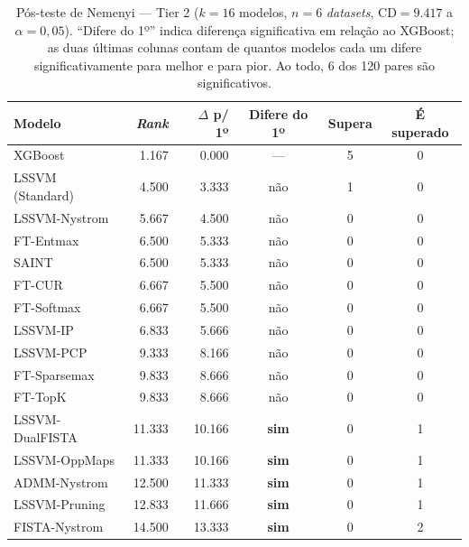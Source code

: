 \begin{table}[ht]
  \centering
  \caption{Pós-teste de Nemenyi --- Tier 2 ($k=16$ modelos, $n=6$ \textit{datasets}, $\mathrm{CD}=9.417$ a $\alpha=0{,}05$). ``Difere do 1º'' indica diferença significativa em relação ao XGBoost; as duas últimas colunas contam de quantos modelos cada um difere significativamente para melhor e para pior. Ao todo, 6 dos 120 pares são significativos.}
  \label{tab:tier2_nemenyi}
  \begin{tabular}{lrrccc}
    \toprule
    Modelo & \textit{Rank} & $\Delta$ p/ 1º & Difere do 1º & Supera & É superado \\
    \midrule
    XGBoost & 1.167 & 0.000 & --- & 5 & 0 \\
    LSSVM (Standard) & 4.500 & 3.333 & não & 1 & 0 \\
    LSSVM-Nystrom & 5.667 & 4.500 & não & 0 & 0 \\
    FT-Entmax & 6.500 & 5.333 & não & 0 & 0 \\
    SAINT & 6.500 & 5.333 & não & 0 & 0 \\
    FT-CUR & 6.667 & 5.500 & não & 0 & 0 \\
    FT-Softmax & 6.667 & 5.500 & não & 0 & 0 \\
    LSSVM-IP & 6.833 & 5.666 & não & 0 & 0 \\
    LSSVM-PCP & 9.333 & 8.166 & não & 0 & 0 \\
    FT-Sparsemax & 9.833 & 8.666 & não & 0 & 0 \\
    FT-TopK & 9.833 & 8.666 & não & 0 & 0 \\
    LSSVM-DualFISTA & 11.333 & 10.166 & \textbf{sim} & 0 & 1 \\
    LSSVM-OppMaps & 11.333 & 10.166 & \textbf{sim} & 0 & 1 \\
    ADMM-Nystrom & 12.500 & 11.333 & \textbf{sim} & 0 & 1 \\
    LSSVM-Pruning & 12.833 & 11.666 & \textbf{sim} & 0 & 1 \\
    FISTA-Nystrom & 14.500 & 13.333 & \textbf{sim} & 0 & 2 \\
    \bottomrule
  \end{tabular}
\end{table}

